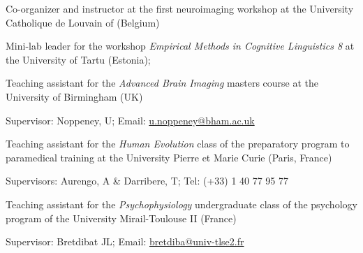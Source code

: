 
Co-organizer and instructor at the first neuroimaging workshop at the University Catholique de Louvain of (Belgium) 

Mini-lab leader for the workshop \textit{Empirical Methods in Cognitive Linguistics 8} at the University of Tartu (Estonia); 

Teaching assistant for the \textit{Advanced Brain Imaging} masters course at the University of Birmingham (UK)

Supervisor: Noppeney, U; Email: \href{mailto:u.noppeney@bham.ac.uk}{u.noppeney@bham.ac.uk}

Teaching assistant for the \textit{Human Evolution} class of the preparatory program to paramedical training at the University Pierre et Marie Curie (Paris, France)

Supervisors: Aurengo, A \& Darribere, T; Tel: (+33) 1 40 77 95 77

Teaching assistant for the \textit{Psychophysiology} undergraduate class of the psychology program of the University Mirail-Toulouse II (France)

Supervisor: Bretdibat JL; Email: \href{mailto:bretdiba@univ-tlse2.fr}{bretdiba@univ-tlse2.fr}
